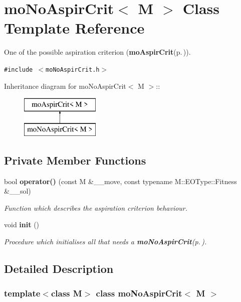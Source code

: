 \section{mo\-No\-Aspir\-Crit$<$ M $>$ Class Template Reference}
\label{classmo_no_aspir_crit}
One of the possible aspiration criterion ({\bf mo\-Aspir\-Crit}{\rm (p.\,\pageref{classmo_aspir_crit})}).  


{\tt \#include $<$mo\-No\-Aspir\-Crit.h$>$}

Inheritance diagram for mo\-No\-Aspir\-Crit$<$ M $>$::\begin{figure}[H]
\begin{center}
\leavevmode
\includegraphics[height=2cm]{classmo_no_aspir_crit}
\end{center}
\end{figure}
\subsection*{Private Member Functions}
\begin{CompactItemize}
\item 
bool {\bf operator()} (const M \&\_\-\_\-move, const typename M::EOType::Fitness \&\_\-\_\-sol)
\begin{CompactList}\small\item\em Function which describes the aspiration criterion behaviour. \item\end{CompactList}\item 
void {\bf init} ()
\begin{CompactList}\small\item\em Procedure which initialises all that needs a {\bf mo\-No\-Aspir\-Crit}{\rm (p.\,\pageref{classmo_no_aspir_crit})}. \item\end{CompactList}\end{CompactItemize}


\subsection{Detailed Description}
\subsubsection*{template$<$class M$>$ class mo\-No\-Aspir\-Crit$<$ M $>$}

